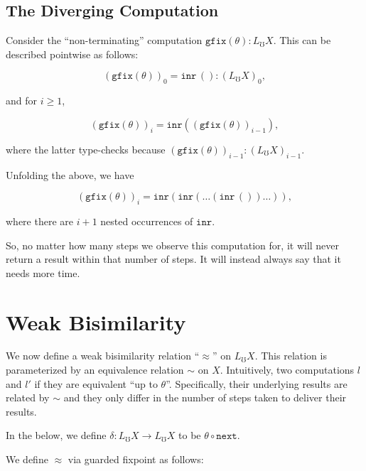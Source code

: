 \documentclass{article}
\newcommand{\nxt}{\texttt{next}}
\newcommand{\gfix}{\texttt{gfix}}
\newcommand{\lift}{L_\mho}
\newcommand{\inr}{\texttt{inr}}
\begin{document}
\subsection{The Diverging Computation}

Consider the ``non-terminating'' computation
$\gfix (\theta) \colon \lift X$. This can be described pointwise
as follows:

\[ (\gfix (\theta))_0 = \inr \, () \colon (\lift X)_0, \]

and for $i \ge 1$,

\[ (\gfix (\theta))_i = \inr ((\gfix (\theta))_{i-1}), \]

where the latter type-checks because $(\gfix (\theta))_{i-1} \colon (\lift X)_{i-1}$.

Unfolding the above, we have

\[
    (\gfix (\theta))_i = \inr (\inr ( \dots ( \inr \, () ) \dots )),
\]

where there are $i+1$ nested occurrences of $\inr$.

So, no matter how many steps we observe this computation for,
it will never return a result within that number of steps.
It will instead always say that it needs more time.



\section{Weak Bisimilarity}

We now define a weak bisimilarity relation ``$\approx$'' on $\lift X$.
This relation is parameterized by an equivalence relation
$\sim$ on $X$. Intuitively, two computations $l$ and $l'$
if they are equivalent ``up to $\theta$''. Specifically,
their underlying results are related by $\sim$ and they only
differ in the number of steps taken to deliver their results.

In the below, we define $\delta \colon \lift X \to \lift X$ to be
$\theta \circ \nxt$.

We define $\approx$ via guarded fixpoint as follows:
\end{document}
